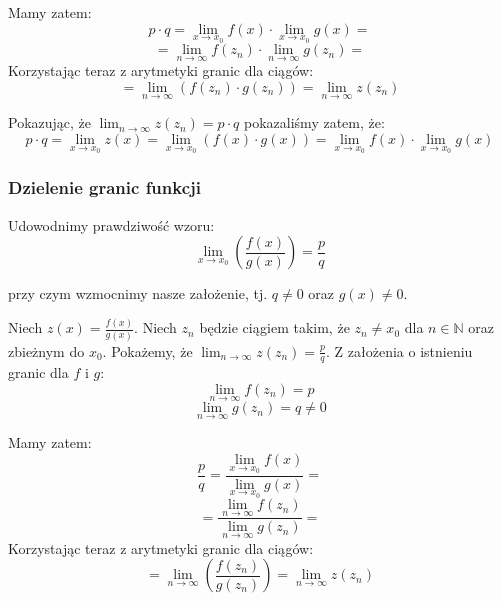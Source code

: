 \documentclass{article}
\begin{document}
Mamy zatem:
\begin{equation*}
    p \cdot q = \lim_{x \to x_0} f(x) \cdot \lim_{x \to x_0} g(x) = 
\end{equation*}
\begin{equation*}
    = \lim_{n \to \infty} f(z_n) \cdot \lim_{n \to \infty} g(z_n) =
\end{equation*}
Korzystając teraz z arytmetyki granic dla ciągów:
\begin{equation*}
    = \lim_{n \to \infty} (f(z_n) \cdot g(z_n)) = \lim_{n \to \infty} z(z_n)
\end{equation*}

Pokazując, że \(\lim_{n \to \infty} z(z_n) = p \cdot q\) pokazaliśmy zatem, że:
\begin{equation*}
    p \cdot q = \lim_{x \to x_0} z(x) = \lim_{x \to x_0} (f(x) \cdot g(x)) = \lim_{x \to x_0} f(x) \cdot \lim_{x \to x_0} g(x)
\end{equation*}

\subsubsection{Dzielenie granic funkcji}

Udowodnimy prawdziwość wzoru: 
\begin{equation*}
    \lim_{x \to x_0}(\frac{f(x)}  {g(x)}) = \frac{p}{q}
\end{equation*}

przy czym wzmocnimy nasze założenie, tj. \(q \neq 0\) oraz \(g(x) \neq 0\).

Niech \(z(x) = \frac{f(x)}{g(x)}\). Niech \(z_n\) będzie ciągiem takim, że \(z_n \neq x_0\) dla \(n \in \mathbb{N}\) oraz zbieżnym do \(x_0\).
Pokażemy, że \(\lim_{n \to \infty} z(z_n) = \frac{p}{q}\). Z założenia o istnieniu granic dla \(f\) i \(g\):
\begin{equation*}
    \lim_{n \to \infty} f(z_n) = p
\end{equation*}
\begin{equation*}
    \lim_{n \to \infty} g(z_n) = q \neq 0
\end{equation*}

Mamy zatem:
\begin{equation*}
    \frac{p}{q} = \frac{\lim_{x \to x_0} f(x)} {\lim_{x \to x_0} g(x)} = 
\end{equation*}
\begin{equation*}
    = \frac{\lim_{n \to \infty} f(z_n)} {\lim_{n \to \infty} g(z_n)} =
\end{equation*}
Korzystając teraz z arytmetyki granic dla ciągów:
\begin{equation*}
    = \lim_{n \to \infty} (\frac{f(z_n)} {g(z_n)}) = \lim_{n \to \infty} z(z_n)
\end{equation*}
\end{document}

